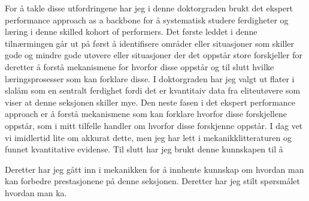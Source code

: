  



For å takle disse utfordringene har jeg i denne doktorgraden brukt det ekspert performance approach as a backbone for å systematisk studere ferdigheter og læring i denne skilled kohort of performers. Det første leddet i denne tilnærmingen går ut på først å identifisere områder eller situasjoner som skiller gode og mindre gode utøvere eller situasjoner der det oppstår store forskjeller for deretter å forstå mekanismene for hvorfor disse oppstår og til slutt hvilke læringsprosesser som kan forklare disse. I doktorgraden har jeg valgt ut flater i slalåm som en sentralt ferdighet fordi det er kvantitaiv data fra eliteutøvere som viser at denne seksjonen skiller mye. Den neste fasen i det ekspert performance approach er å forstå mekanismene som kan forklare hvorfor disse forskjellene oppstår, som i mitt tilfelle handler om hvorfor disse forskjenne oppstår. I dag vet vi imidlertid lite om akkurat dette, men jeg har lett i mekanikklitteraturen og funnet kvantitative evidense. Til slutt har jeg brukt denne kunnskapen til å   


Deretter har jeg gått inn i mekanikken for å innhente kunnskap om hvordan man kan forbedre prestasjonene på denne seksjonen. Deretter har jeg stilt spørsmålet hvordan man ka. 






 
 














